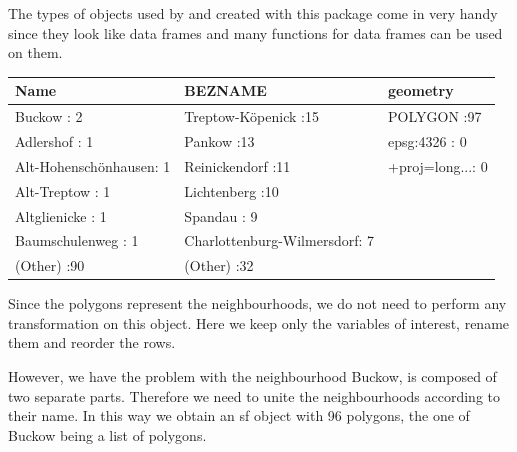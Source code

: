 

The types of objects used by and created with this package come in very handy since they look like data frames and many functions for data frames can be used on them. 

\begin{table}[H]
\centering
\begin{tabular}{lll}
  \hline \hline
                  Name &                       BEZNAME &          geometry \\ 
  \hline
Buckow              : 2   & Treptow-Köpenick          :15   & POLYGON      :97   \\ 
  Adlershof           : 1   & Pankow                    :13   & epsg:4326    : 0   \\ 
  Alt-Hohenschönhausen: 1   & Reinickendorf             :11   & +proj=long...: 0   \\ 
  Alt-Treptow         : 1   & Lichtenberg               :10   &  \\ 
  Altglienicke        : 1   & Spandau                   : 9   &  \\ 
  Baumschulenweg      : 1   & Charlottenburg-Wilmersdorf: 7   &  \\ 
  (Other)             :90   & (Other)                   :32   &  \\ 
   \hline \hline
\end{tabular}
\end{table}

Since the polygons represent the neighbourhoods, we do not need to perform any transformation on this object. Here we keep only the variables of interest, rename them and reorder the rows.



However, we have the problem with the neighbourhood Buckow, is composed of two separate
parts. Therefore we need to unite the neighbourhoods according to their name. In this way we obtain an sf object with 96 polygons, the one of Buckow being a list of polygons.

